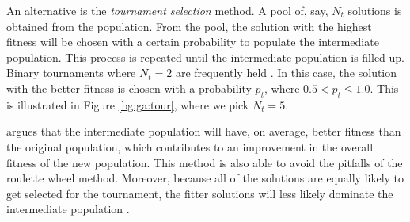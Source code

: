 \documentclass[12pt, twoside, a4paper]{report}
\begin{document}
An alternative is the \textit{tournament selection} method. A pool of, say, $N_t$ solutions is obtained from the population. From the pool, the solution with the highest fitness will be chosen with a certain probability to populate the intermediate population. This process is repeated until the intermediate population is filled up.  Binary tournaments where $N_t=2$ are frequently held \cite{RefWorks:242, RefWorks:243}. In this case, the solution with the better fitness is chosen with a probability $p_t$, where $0.5 < p_t \leq 1.0$. This is illustrated in Figure \ref{bg:ga:tour}, where we pick $N_t=5$.

\cite{RefWorks:242} argues that the intermediate population will have, on average, better fitness than the original population, which contributes to an improvement in the overall fitness of the new population. This method is also able to avoid the pitfalls of the roulette wheel method. Moreover, because all of the solutions are equally likely to get selected for the tournament, the fitter solutions will less likely dominate the intermediate population \cite{RefWorks:245}.
\end{document}

